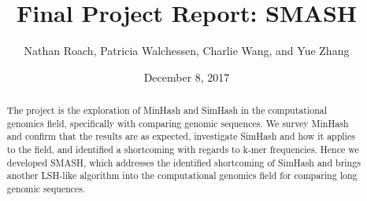 \documentclass[12pt, letterpaper]{article}
\title{Final Project Report: SMASH}
\author{Nathan Roach, Patricia Walchessen, Charlie Wang, and Yue Zhang}
\date{December 8, 2017}
\begin{document}
\maketitle
\begin{abstract}
The project is the exploration of MinHash and SimHash in the
computational genomics field, specifically with comparing genomic
sequences. We survey MinHash and confirm that the results are as
expected, investigate SimHash and how it applies to the field, and
identified a shortcoming with regards to k-mer frequencies. Hence
we developed SMASH, which addresses the identified shortcoming of
SimHash and brings another LSH-like algorithm into the computational
genomics field for comparing long genomic sequences.
\end{abstract}

\end{document}

